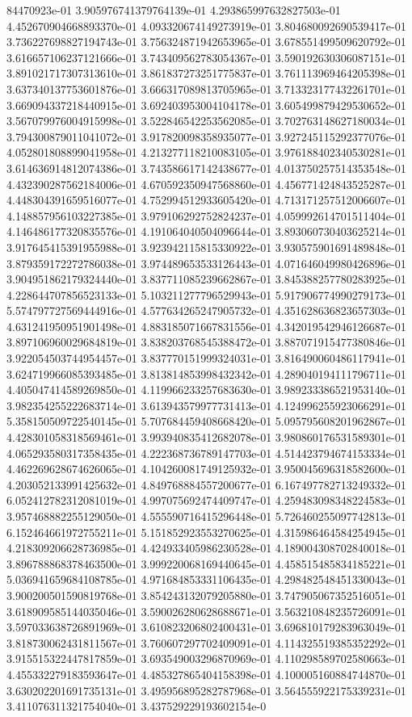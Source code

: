 84470923e-01	3.905976741379764139e-01	4.293865997632827503e-01	4.452670904668893370e-01	4.093320674149273919e-01	3.804680092690539417e-01	3.736227698827194743e-01	3.756324871942653965e-01	3.678551499509620792e-01	3.616657106237121666e-01	3.743409562783054367e-01	3.590192630306087151e-01	3.891021717307313610e-01	3.861837273251775837e-01	3.761113969464205398e-01	3.637340137753601876e-01	3.666317089813705965e-01	3.713323177432261701e-01	3.669094337218440915e-01	3.692403953004104178e-01	3.605499879429530652e-01	3.567079976004915998e-01	3.522846542253562085e-01	3.702763148627180034e-01	3.794300879011041072e-01	3.917820098358935077e-01	3.927245115292377076e-01	4.052801808899041958e-01	4.213277118210083105e-01	3.976188402340530281e-01	3.614636914812074386e-01	3.743586617142438677e-01	4.013750257514353548e-01	4.432390287562184006e-01	4.670592350947568860e-01	4.456771424843525287e-01	4.448304391659516077e-01	4.752994512933605420e-01	4.713171257512006607e-01	4.148857956103227385e-01	3.979106292752824237e-01	4.059992614701511404e-01	4.146486177320835576e-01	4.191064040504096644e-01	3.893060730403625214e-01	3.917645415391955988e-01	3.923942115815330922e-01	3.930575901691489848e-01	3.879359172272786038e-01	3.974489653533126443e-01	4.071646049980426896e-01	3.904951862179324440e-01	3.837711085239662867e-01	3.845388257780283925e-01	4.228644707856523133e-01	5.103211277796529943e-01	5.917906774990279173e-01	5.574797727569444916e-01	4.577634265247905732e-01	4.351628636823657303e-01	4.631241950951901498e-01	4.883185071667831556e-01	4.342019542946126687e-01	3.897106960029684819e-01	3.838203768545388472e-01	3.887071915477380846e-01	3.922054503744954457e-01	3.837770151999324031e-01	3.816490060486117941e-01	3.624719966085393485e-01	3.813814853998432342e-01	4.289040194111796711e-01	4.405047414589269850e-01	4.119966233257683630e-01	3.989233386521953140e-01	3.982354255222683714e-01	3.613943579977731413e-01	4.124996255923066291e-01	5.358150509722540145e-01	5.707684459408668420e-01	5.095795608201962867e-01	4.428301058318569461e-01	3.993940835412682078e-01	3.980860176531589301e-01	4.065293580317358435e-01	4.222368736789147703e-01	4.514423794674153334e-01	4.462269628674626065e-01	4.104260081749125932e-01	3.950045696318582600e-01	4.203052133991425632e-01	4.849768884557200677e-01	6.167497782713249332e-01	6.052412782312081019e-01	4.997075692474409747e-01	4.259483098348224583e-01	3.957468882255129050e-01	4.555590716415296448e-01	5.726460255097742813e-01	6.152464661972755211e-01	5.151852923553270625e-01	4.315986464584254945e-01	4.218309206628736985e-01	4.424933405986230528e-01	4.189004308702840018e-01	3.896788868378463500e-01	3.999220068169440645e-01	4.458515485834185221e-01	5.036941659684108785e-01	4.971684853331106435e-01	4.298482548451330043e-01	3.900200501590819768e-01	3.854243132079205880e-01	3.747905067352516051e-01	3.618909585144035046e-01	3.590026280628688671e-01	3.563210848235726091e-01	3.597033638726891969e-01	3.610823206802400431e-01	3.696810179283963049e-01	3.818730062431811567e-01	3.760607297702409091e-01	4.114325519385352292e-01	3.915515322447817859e-01	3.693549003296870969e-01	4.110298589702580663e-01	4.455332279183593647e-01	4.485327865404158398e-01	4.100005160884744870e-01	3.630202201691735131e-01	3.495956895282787968e-01	3.564555922175339231e-01	3.411076311321754040e-01	3.437529229193602154e-0